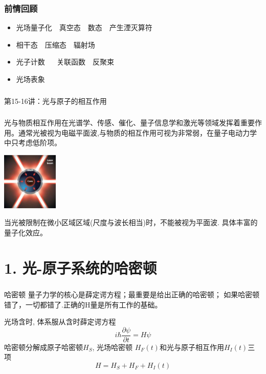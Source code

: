 \begin{frame}
    \frametitle{前情回顾}
    \begin{itemize}
        \item 光场量子化~~真空态~~数态~~产生湮灭算符 
        \item 相干态~~压缩态~~辐射场 
        \item 光子计数 ~~ 关联函数~~反聚束
        \item 光场表象
    \end{itemize}     
\end{frame}

\begin{frame} [plain]
    \frametitle{}
    \Background[1] 
    \begin{center}
    {\huge 第15-16讲：光与原子的相互作用}
    \end{center}  
    \addtocounter{framenumber}{-1}   
\end{frame}



\begin{frame} 
\frametitle{}
{\Bullet}光与物质相互作用在光谱学、传感、催化、量子信息学和激光等领域发挥着重要作用。通常光被视为电磁平面波,与物质的相互作用可视为非常弱，在量子电动力学中只考虑低阶项。\\
  \begin{center}
       \includegraphics[width=0.2\textwidth]{figs/23.png}
  \end{center}
{\Bullet}当光被限制在微小区域区域(尺度与波长相当)时，不能被视为平面波. 具体丰富的量子化效应。
\end{frame}

\section{1. 光-原子系统的哈密顿}

\begin{frame} 
 \frametitle{}
 \begin{tcolorbox2}[1.0]{哈密顿}
    量子力学的核心是薛定谔方程；最重要是给出正确的哈密顿； 如果哈密顿错了，一切都错了.正确的H量是所有工作的基础。
  \end{tcolorbox2}
 光场含时, 体系服从含时薛定谔方程
      \[ i \hbar \frac{\partial \psi}{\partial t} = H \psi \]
      哈密顿分解成原子哈密顿$H_S$, 光场哈密顿 $H_F(t)$和光与原子相互作用$H_I(t)$三项
      \[H= H_S+H_F+H_I(t) \]
\end{frame}

